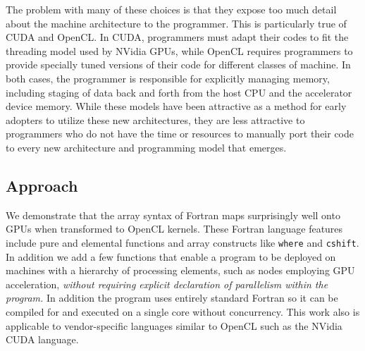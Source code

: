 
The problem with many of these choices is that they expose too much
detail about the machine architecture to the programmer.  This is
particularly true of CUDA and OpenCL.  In CUDA, programmers must adapt
their codes to fit the threading model used by NVidia GPUs, while
OpenCL requires programmers to provide specially tuned versions of
their code for different classes of machine.  In both cases, the
programmer is responsible for explicitly managing memory,
including staging of data back and forth from the host CPU and the
accelerator device memory.  While these models have been attractive as
a method for early adopters to utilize these new architectures, they
are less attractive to programmers who do not have the time or
resources to manually port their code to every new architecture and
programming model that emerges.


\subsection{Approach}


We demonstrate that the array syntax of Fortran maps surprisingly well
onto GPUs when transformed to OpenCL kernels.  These Fortran language
features include pure and elemental functions and array constructs
like {\tt where} and {\tt cshift}.  In addition we add a few functions
that enable a program to be deployed on machines with a hierarchy of
processing elements, such as nodes employing GPU acceleration,
\emph{without requiring explicit declaration of parallelism within the
  program.}  In addition the program uses entirely standard Fortran so
it can be compiled for and executed on a single core without concurrency.
This work also is applicable to vendor-specific languages similar to
OpenCL such as the NVidia CUDA language.

